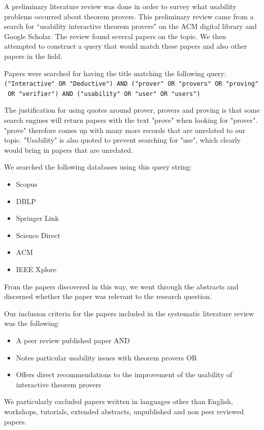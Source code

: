 \documentclass[
]{article}
\providecommand{\tightlist}{%
  \setlength{\itemsep}{0pt}\setlength{\parskip}{0pt}}
\begin{document}
A preliminary literature review was done in order to survey what
usability problems occurred about theorem provers. This preliminary
review came from a search for ``usability interactive theorem provers"
on the ACM digital library and Google Scholar. The review found several
papers on the topic. We then attempted to construct a query that would
match these papers and also other papers in the field.

Papers were searched for having the title matching the following query:
\texttt{("Interactive"\ OR\ "Deductive")\ AND\ ("prover"\ OR\ "provers"\ OR\ "proving"\ OR\ "verifier")\ AND\ ("usability"\ OR\ "user"\ OR\ "users")}

The justification for using quotes around prover, provers and proving is
that some search engines will return papers with the text "prove" when
looking for "prover". "prove" therefore comes up with many more records
that are unrelated to our topic. "Usability" is also quoted to prevent
searching for "use", which clearly would bring in papers that are
unrelated.

We searched the following databases using this query string:

\begin{itemize}
\tightlist
\item
  Scopus
\item
  DBLP
\item
  Springer Link
\item
  Science Direct
\item
  ACM
\item
  IEEE Xplore
\end{itemize}

From the papers discovered in this way, we went through the abstracts
and discerned whether the paper was relevant to the research question.

Our inclusion criteria for the papers included in the systematic
literature review was the following:

\begin{itemize}
\tightlist
\item
  A peer review published paper AND
\item
  Notes particular usability issues with theorem provers OR
\item
  Offers direct recommendations to the improvement of the usability of
  interactive theorem provers
\end{itemize}

We particularly excluded papers written in languages other than English,
workshops, tutorials, extended abstracts, unpublished and non peer
reviewed papers.
\end{document}
